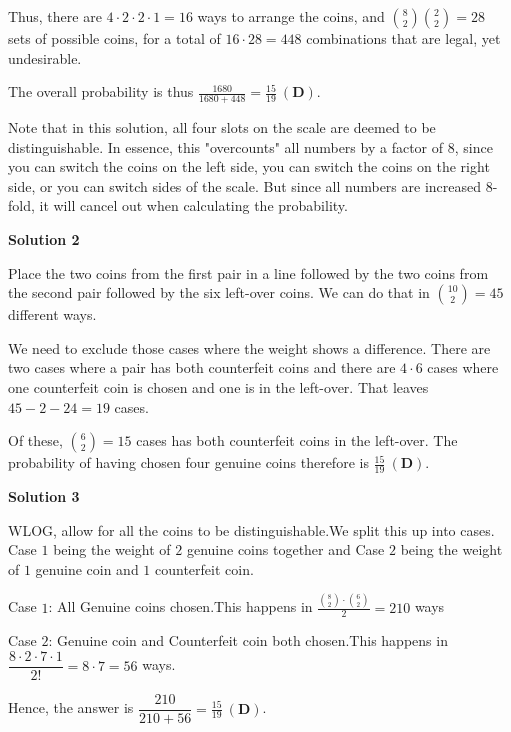 \begin{enumerate}
 Thus, there are $4\cdot 2\cdot 2\cdot 1 = 16$ ways to arrange the coins, and $\binom{8}{2}\binom{2}{2} = 28$ sets of possible coins, for a total of $16\cdot 28 = 448$ combinations that are legal, yet undesirable.

 The overall probability is thus $\frac{1680}{1680 + 448} = \boxed{\frac{15}{19} \ \mathbf{(D)}}$.

 Note that in this solution, all four slots on the scale are deemed to be distinguishable.  In essence, this "overcounts" all numbers by a factor of $8$, since you can switch the coins on the left side, you can switch the coins on the right side, or you can switch sides of the scale.  But since all numbers are increased 8-fold, it will cancel out when calculating the probability.

 



\textbf{Solution 2}

Place the two coins from the first pair in a line followed by the two coins from the second pair followed by the six left-over coins.  We can do that in $\binom{10}{2} = 45$ different ways.

 We need to exclude those cases where the weight shows a difference.  There are two cases where a pair has both counterfeit coins and there are $4\cdot6$ cases where one counterfeit coin is chosen and one is in the left-over.  That leaves $45-2-24=19$ cases.

 Of these, $\binom{6}{2}=15$ cases has both counterfeit coins in the left-over.  The probability of having chosen four genuine coins therefore is $\boxed{\frac{15}{19} \ \mathbf{(D)}}$.

 



\textbf{Solution 3}

WLOG, allow for all the coins to be distinguishable.We split this up into cases. Case $1$ being the weight of $2$ genuine coins together and Case $2$ being the weight of $1$ genuine coin and $1$ counterfeit coin.

 Case $1$: All Genuine coins chosen.This happens in $\frac{\binom{8}{2}\cdot\binom{6}{2}}{2}=210$ ways

 Case $2$: Genuine coin and Counterfeit coin both chosen.This happens in $\dfrac{8\cdot2\cdot7\cdot1}{2!}=8\cdot7=56$ ways.

 Hence, the answer is $\dfrac{210}{210+56}=\boxed{\frac{15}{19} \ \mathbf{(D)}}$.

 




\end{enumerate}
